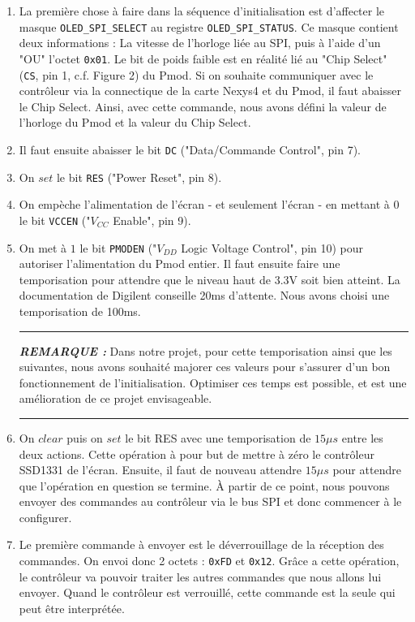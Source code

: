 \documentclass[11pt]{article}
\newcommand{\HRule}{\rule{\linewidth}{0.5mm}}
\newenvironment{rmq}[1] {\noindent\HRule\par\vspace{5pt}\textbf{\textit{REMARQUE : }}#1}{\\\HRule\par\vspace{5pt}}
\begin{document}
\begin{enumerate}

    \item La première chose à faire dans la séquence d'initialisation est d'affecter le masque \texttt{OLED\_SPI\_SELECT} au registre \texttt{OLED\_SPI\_STATUS}. Ce masque contient deux informations : La vitesse de l'horloge liée au SPI, puis à l'aide d'un "OU" l'octet \texttt{0x01}. Le bit de poids faible est en réalité lié au "Chip Select" (\texttt{CS}, pin 1, c.f. Figure 2) du Pmod. Si on souhaite communiquer avec le contrôleur via la connectique de la carte Nexys4 et du Pmod, il faut abaisser le Chip Select. Ainsi, avec cette commande, nous avons défini la valeur de l'horloge du Pmod et la valeur du Chip Select.
    \item Il faut ensuite abaisser le bit \texttt{DC} ("Data/Commande Control", pin 7). %
    \item On $set$ le bit \texttt{RES} ("Power Reset", pin 8). 
    \item On empèche l'alimentation de l'écran - et seulement l'écran - en mettant à $0$ le bit \texttt{VCCEN} ("$V_{CC}$ Enable", pin 9). 
    \item On met à $1$ le bit \texttt{PMODEN} ("$V_{DD}$ Logic Voltage Control", pin 10) pour autoriser l'alimentation du Pmod entier. Il faut ensuite faire une temporisation pour attendre que le niveau haut de $3.3\text{V}$ soit bien atteint. La documentation de Digilent conseille 20ms d'attente. Nous avons choisi une temporisation de 100ms. 

    \begin{rmq}
    Dans notre projet, pour cette temporisation ainsi que les suivantes, nous avons souhaité majorer ces valeurs pour s'assurer d'un bon fonctionnement de l'initialisation. Optimiser ces temps est possible, et est une amélioration de ce projet envisageable. 
    \end{rmq}

    \item On $clear$ puis on $set$ le bit RES avec une temporisation de $15 \mu s$ entre les deux actions. Cette opération à pour but de mettre à zéro le contrôleur SSD1331 de l'écran. Ensuite, il faut de nouveau attendre $15 \mu s$ pour attendre que l'opération en question se termine. À partir de ce point, nous pouvons envoyer des commandes au contrôleur via le bus SPI et donc commencer à le configurer. 

    \item Le première commande à envoyer est le déverrouillage de la réception des commandes. On envoi donc 2 octets : \texttt{0xFD} et \texttt{0x12}. Grâce a cette opération, le contrôleur va pouvoir traiter les autres commandes que nous allons lui envoyer. Quand le contrôleur est verrouillé, cette commande est la seule qui peut être interprétée. 


\end{enumerate}
\end{document}
